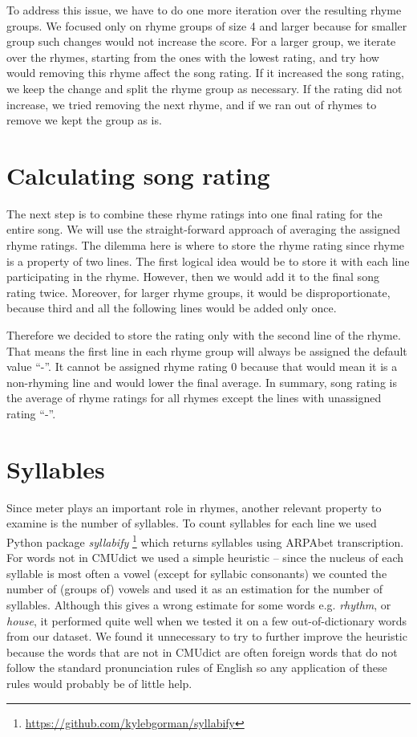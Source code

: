 To address this issue, we have to do one more iteration over the resulting rhyme groups. We focused only on rhyme groups of size 4 and larger because for smaller group such changes would not increase the score. For a larger group, we iterate over the rhymes, starting from the ones with the lowest rating, and try how would removing this rhyme affect the song rating. If it increased the song rating, we keep the change and split the rhyme group as necessary. If the rating did not increase, we tried removing the next rhyme, and if we ran out of rhymes to remove we kept the group as is.

\section{Calculating song rating}
The next step is to combine these rhyme ratings into one final rating for the entire song. We will use the straight-forward approach of averaging the assigned rhyme ratings. The dilemma here is where to store the rhyme rating since rhyme is a property of two lines. The first logical idea would be to store it with each line participating in the rhyme. However, then we would add it to the final song rating twice. Moreover, for larger rhyme groups, it would be disproportionate, because third and all the following lines would be added only once. 

Therefore we decided to store the rating only with the second line of the rhyme. That means the first line in each rhyme group will always be assigned the default value ``-''. It cannot be assigned rhyme rating 0 because that would mean it is a non-rhyming line and would lower the final average. In summary, song rating is the average of rhyme ratings for all rhymes except the lines with unassigned rating ``-''.






	
\section{Syllables}
Since meter plays an important role in rhymes, another relevant property to examine is the number of syllables. To count syllables for each line we used Python package \textit{syllabify} \footnote{\url{https://github.com/kylebgorman/syllabify}} which returns syllables using ARPAbet transcription. For words not in CMUdict we used a simple heuristic -- since the nucleus of each syllable is most often a vowel (except for syllabic consonants) we counted the number of (groups of) vowels and used it as an estimation for the number of syllables. Although this gives a wrong estimate for some words e.g. \textit{rhythm}, or \textit{house}, it performed quite well when we tested it on a few out-of-dictionary words from our dataset. We found it unnecessary to try to further improve the heuristic because the words that are not in CMUdict are often foreign words that do not follow the standard pronunciation rules of English so any application of these rules would probably be of little help.

